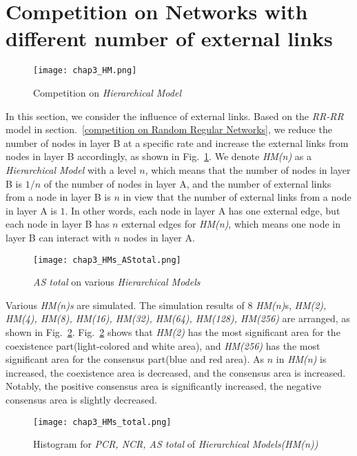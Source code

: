 \section{Competition on Networks with different number of external links}
\begin{figure}[!htb]
	\centering
	\texttt{[image: chap3\_HM.png]}
	\caption{Competition on \textit{Hierarchical Model}}
	\label{chap3_HM}
\end{figure}
In this section, we consider the influence of external links. Based on the \textit{RR-RR} model in section.~\ref{competition on Random Regular Networks}, we reduce the number of nodes in layer B at a specific rate and increase the external links from nodes in layer B accordingly, as shown in Fig.~\ref{chap3_HM}.  We denote \textit{HM(n)} as a \textit{Hierarchical Model} with a level $n$, which means that the number of nodes in layer B is $1/n$ of the number of nodes in layer A, and the number of external links from a node in layer B is $n$ in view that the number of external links from a node in layer A is $1$. In other words, each node in layer A has one external edge, but each node in layer B has $n$ external edges for \textit{HM(n)}, which means one node in layer B can interact with $n$ nodes in layer A.

\begin{figure}[!htb]
	\centering
	\texttt{[image: chap3\_HMs\_AStotal.png]}
	\caption{\textit{AS total} on various \textit{Hierarchical Models}}
	\label{chap3_HMs_AStotal}
\end{figure}

Various \textit{HM(n)s} are simulated.  The simulation results of $8$ \textit{HM(n)}s, \textit{HM(2), HM(4), HM(8), HM(16), HM(32), HM(64), HM(128), HM(256)} are arranged, as shown in Fig.~\ref{chap3_HMs_AStotal}. Fig.~\ref{chap3_HMs_AStotal} shows that \textit{HM(2)} has the most significant area for the coexistence part(light-colored and white area), and \textit{HM(256)} has the most significant area for the consensus part(blue and red area). As $n$ in \textit{HM(n)} is increased, the coexistence area is decreased, and the consensus area is increased. Notably, the positive consensus area is significantly increased, the negative consensus area is slightly decreased.
 
\begin{figure}[!htb]
	\centering
	\texttt{[image: chap3\_HMs\_total.png]}
	\caption{Histogram for \textit{PCR, NCR, AS total} of \textit{Hierarchical Models(HM(n))}}
	\label{chap3_HMs_total}
\end{figure}

